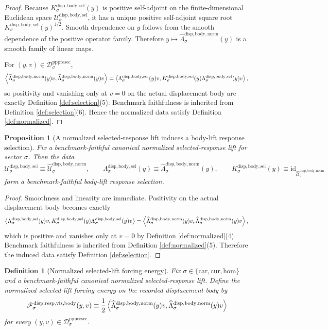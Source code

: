 \documentclass[11pt]{article}
\newcommand{\Car}{\mathrm{car}}
\newcommand{\Cur}{\mathrm{cur}}
\newcommand{\Hom}{\mathrm{hom}}
\newcommand{\PrePreProtoSectionResidualBody}[1]{\mathcal D_{#1}^{\mathrm{pppresec}}}
\newcommand{\VisibleBodyForcingLaw}[1]{\mathscr F_{#1}^{\mathrm{disp,resp,vis,body}}}
\newcommand{\LiftSelectionCarrier}[1]{\mathcal U_{#1}^{\mathrm{disp,body,sel}}}
\newcommand{\SelectedResponseLift}[1]{\Lambda_{#1}^{\mathrm{disp,body,sel}}}
\newcommand{\SelectedResponseOperator}[1]{K_{#1}^{\mathrm{disp,body,sel}}}
\newcommand{\NormalizedLiftCarrier}[1]{\widehat{\mathcal U}_{#1}^{\mathrm{disp,body,norm}}}
\newcommand{\NormalizedSelectedResponseLift}[1]{\widehat{\Lambda}_{#1}^{\mathrm{disp,body,norm}}}
\newtheorem{definition}{Definition}
\newtheorem{proposition}{Proposition}
\begin{document}
\begin{proof}
Because \(\SelectedResponseOperator{\sigma}(y)\) is positive self-adjoint on the finite-dimensional Euclidean space \(\LiftSelectionCarrier{\sigma}\), it has a unique positive self-adjoint square root \(\SelectedResponseOperator{\sigma}(y)^{1/2}\). Smooth dependence on \(y\) follows from the smooth dependence of the positive operator family. Therefore \(y\mapsto \NormalizedSelectedResponseLift{\sigma}(y)\) is a smooth family of linear maps.

For \((y,v)\in\PrePreProtoSectionResidualBody{\sigma}\),
\[
\ev{
\NormalizedSelectedResponseLift{\sigma}(y)v,
\NormalizedSelectedResponseLift{\sigma}(y)v
}
=
\ev{
\SelectedResponseLift{\sigma}(y)v,
\SelectedResponseOperator{\sigma}(y)\SelectedResponseLift{\sigma}(y)v
},
\]
so positivity and vanishing only at \(v=0\) on the actual displacement body are exactly Definition \ref{def:selection}(5). Benchmark faithfulness is inherited from Definition \ref{def:selection}(6). Hence the normalized data satisfy Definition \ref{def:normalized}.
\end{proof}

\begin{proposition}[A normalized selected-response lift induces a body-lift response selection]
\label{prop:denormalize}
Fix a benchmark-faithful canonical normalized selected-response lift for sector \(\sigma\). Then the data
\[
\LiftSelectionCarrier{\sigma}
\equiv
\NormalizedLiftCarrier{\sigma},
\qquad
\SelectedResponseLift{\sigma}(y)
\equiv
\NormalizedSelectedResponseLift{\sigma}(y),
\qquad
\SelectedResponseOperator{\sigma}(y)
\equiv
\mathrm{id}_{\NormalizedLiftCarrier{\sigma}}
\]
form a benchmark-faithful body-lift response selection.
\end{proposition}

\begin{proof}
Smoothness and linearity are immediate. Positivity on the actual displacement body becomes exactly
\[
\ev{
\SelectedResponseLift{\sigma}(y)v,
\SelectedResponseOperator{\sigma}(y)\SelectedResponseLift{\sigma}(y)v
}
=
\ev{
\NormalizedSelectedResponseLift{\sigma}(y)v,
\NormalizedSelectedResponseLift{\sigma}(y)v
},
\]
which is positive and vanishes only at \(v=0\) by Definition \ref{def:normalized}(4). Benchmark faithfulness is inherited from Definition \ref{def:normalized}(5). Therefore the induced data satisfy Definition \ref{def:selection}.
\end{proof}

\begin{definition}[Normalized selected-lift forcing energy]
\label{def:energy}
Fix \(\sigma\in\{\Car,\Cur,\Hom\}\) and a benchmark-faithful canonical normalized selected-response lift. Define the normalized selected-lift forcing energy on the recorded displacement body by
\begin{equation}
\VisibleBodyForcingLaw{\sigma}(y,v)
\equiv
\frac{1}{2}
\ev{
\NormalizedSelectedResponseLift{\sigma}(y)v,
\NormalizedSelectedResponseLift{\sigma}(y)v
}
\label{eq:forcing}
\end{equation}
for every \((y,v)\in\PrePreProtoSectionResidualBody{\sigma}\).
\end{definition}
\end{document}
